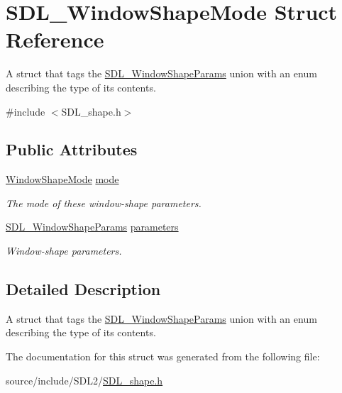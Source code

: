 \hypertarget{struct_s_d_l___window_shape_mode}{}\section{S\+D\+L\+\_\+\+Window\+Shape\+Mode Struct Reference}
\label{struct_s_d_l___window_shape_mode}


A struct that tags the \hyperlink{union_s_d_l___window_shape_params}{S\+D\+L\+\_\+\+Window\+Shape\+Params} union with an enum describing the type of its contents.  




{\ttfamily \#include $<$S\+D\+L\+\_\+shape.\+h$>$}

\subsection*{Public Attributes}
\begin{DoxyCompactItemize}
\item 
\hypertarget{struct_s_d_l___window_shape_mode_a40ebd8b9a76d982cbd87563386cc05de}{}\hyperlink{_s_d_l__shape_8h_aa30948f2699e316a43b740eccebe5c20}{Window\+Shape\+Mode} \hyperlink{struct_s_d_l___window_shape_mode_a40ebd8b9a76d982cbd87563386cc05de}{mode}\label{struct_s_d_l___window_shape_mode_a40ebd8b9a76d982cbd87563386cc05de}

\begin{DoxyCompactList}\small\item\em The mode of these window-\/shape parameters. \end{DoxyCompactList}\item 
\hypertarget{struct_s_d_l___window_shape_mode_a2f79bb294034156207fa6d88d3a8c819}{}\hyperlink{union_s_d_l___window_shape_params}{S\+D\+L\+\_\+\+Window\+Shape\+Params} \hyperlink{struct_s_d_l___window_shape_mode_a2f79bb294034156207fa6d88d3a8c819}{parameters}\label{struct_s_d_l___window_shape_mode_a2f79bb294034156207fa6d88d3a8c819}

\begin{DoxyCompactList}\small\item\em Window-\/shape parameters. \end{DoxyCompactList}\end{DoxyCompactItemize}


\subsection{Detailed Description}
A struct that tags the \hyperlink{union_s_d_l___window_shape_params}{S\+D\+L\+\_\+\+Window\+Shape\+Params} union with an enum describing the type of its contents. 

The documentation for this struct was generated from the following file\+:\begin{DoxyCompactItemize}
\item 
source/include/\+S\+D\+L2/\hyperlink{_s_d_l__shape_8h}{S\+D\+L\+\_\+shape.\+h}\end{DoxyCompactItemize}
